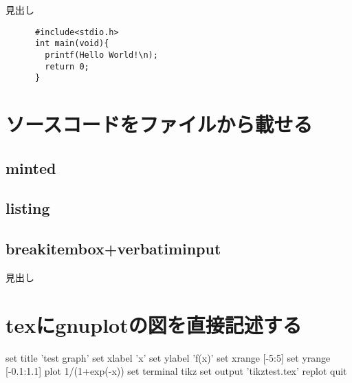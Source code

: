\documentclass[a4j,titlepage,dvipdfmx]{jsarticle}   %
\begin{document}
  \begin{breakitembox}[l]{見出し}
    \begin{verbatim}
      #include<stdio.h>
      int main(void){
        printf(Hello World!\n);
        return 0;
      }
    \end{verbatim}
  \end{breakitembox}

\section{ソースコードをファイルから載せる}
\subsection{minted}

\subsection{listing}


\subsection{breakitembox+verbatiminput}
\begin{breakitembox}[l]{見出し}
   
\end{breakitembox}

\section{texにgnuplotの図を直接記述する}
\begin{shellcode}
  set title 'test graph'
  set xlabel 'x'
  set ylabel 'f(x)'
  set xrange [-5:5]
  set yrange [-0.1:1.1]
  plot 1/(1+exp(-x))
  set terminal tikz
  set output 'tikztest.tex'
  replot
  quit
\end{shellcode}
\centering
\resizebox{\columnwidth}{!}{}
\end{document}
